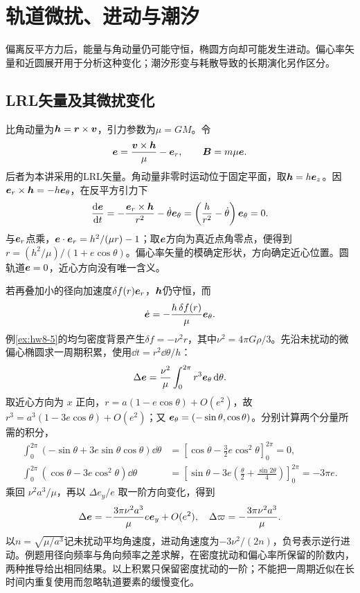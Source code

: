 \section{轨道微扰、进动与潮汐}

偏离反平方力后，能量与角动量仍可能守恒，椭圆方向却可能发生进动。偏心率矢量和近圆展开用于分析这种变化；潮汐形变与耗散导致的长期演化另作区分。



\subsection{LRL矢量及其微扰变化}
\label{sec:complete8}
比角动量为$\bm{h}=\bm{r}\times\bm{v}$，引力参数为$\mu=GM$。令
\[
 \bm{e}=\frac{\bm{v}\times\bm{h}}{\mu}-\bm{e}_r,
 \qquad \bm{B}=m\mu\bm{e}.
\]
后者为本讲采用的LRL矢量。角动量非零时运动位于固定平面，取$\bm{h}=h\bm{e}_z$。因$\bm{e}_r\times\bm{h}=-h\bm{e}_\theta$，在反平方引力下
\[
 \frac{\mathop{}\!\mathrm d\bm{e}}{\mathop{}\!\mathrm d t}
 =-\frac{\bm{e}_r\times\bm{h}}{r^2}
 -\dot\theta\bm{e}_\theta
 =\left(\frac h{r^2}-\dot\theta\right)\bm{e}_\theta=0.
\]
与$\bm{e}_r$点乘，$\bm{e}\cdot\bm{e}_r=h^2/(\mu r)-1$；取$\bm{e}$方向为真近点角零点，便得到$r=(h^2/\mu)/(1+e\cos\theta)$。偏心率矢量的模确定形状，方向确定近心位置。圆轨道$\bm{e}=0$，近心方向没有唯一含义。

若再叠加小的径向加速度$\delta f(r)\bm{e}_r$，$\bm{h}$仍守恒，而
\[
 \dot{\bm{e}}=-\frac{h\,\delta f(r)}{\mu}\bm{e}_\theta.
\]
例\ref{ex:hw8-5}的均匀密度背景产生$\delta f=-\nu^2r$，其中$\nu^2=4\pi G\rho/3$。先沿未扰动的微偏心椭圆求一周期积累，使用$\dd t=r^2\dd\theta/h$：
\[
 \Delta\bm{e}=\frac{\nu^2}{\mu}\int_0^{2\pi}r^3\bm{e}_\theta\mathop{}\!\mathrm d\theta.
\]
取近心方向为 $x$ 正向，$r=a(1-e\cos\theta)+O(e^2)$，故 $r^3=a^3(1-3e\cos\theta)+O(e^2)$；又 $\bm{e}_\theta=(-\sin\theta,\cos\theta)$。分别计算两个分量所需的积分，
\[
\begin{aligned}
\int_0^{2\pi}(-\sin\theta+3e\sin\theta\cos\theta)\dd\theta
&=[\cos\theta-\tfrac32e\cos^2\theta]_0^{2\pi}=0,\\
\int_0^{2\pi}(\cos\theta-3e\cos^2\theta)\dd\theta
&=\left[\sin\theta-3e\left(\frac\theta2+\frac{\sin2\theta}4\right)\right]_0^{2\pi}
=-3\pi e.
\end{aligned}
\]
乘回 $\nu^2a^3/\mu$，再以 $\Delta e_y/e$ 取一阶方向变化，得到
\[
 \Delta\bm{e}=-\frac{3\pi\nu^2a^3}{\mu}e\bm{e}_y+O(e^2),
 \quad \Delta\varpi=-\frac{3\pi\nu^2a^3}{\mu}.
\]
以$n=\sqrt{\mu/a^3}$记未扰动平均角速度，进动角速度为$-3\nu^2/(2n)$，负号表示逆行进动。例题用径向频率与角向频率之差求解，在密度扰动和偏心率所保留的阶数内，两种推导给出相同结果。以上积累只保留密度扰动的一阶；不能把一周期近似在长时间内重复使用而忽略轨道要素的缓慢变化。


